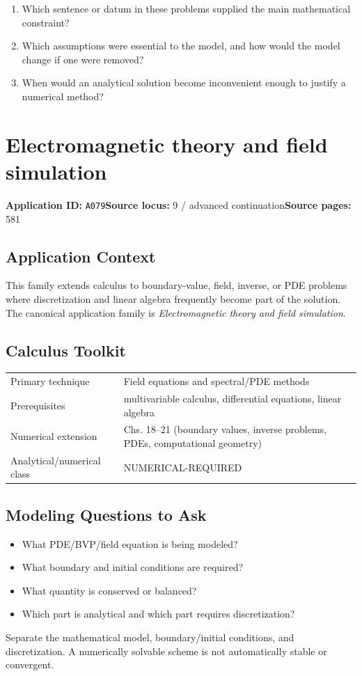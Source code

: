\documentclass[11pt]{book}
\newcommand{\pid}[1]{\texttt{#1}}
\begin{document}
\begin{reflectionbox}\begin{enumerate}
\item Which sentence or datum in these problems supplied the main mathematical constraint?
\item Which assumptions were essential to the model, and how would the model change if one were removed?
\item When would an analytical solution become inconvenient enough to justify a numerical method?
\end{enumerate}\end{reflectionbox}
\chapter{Electromagnetic theory and field simulation}\label{app:A079}
\textbf{Application ID:} \pid{A079}\quad \textbf{Source locus:} 9 / advanced continuation\quad \textbf{Source pages:} 581
\section*{Application Context}
This family extends calculus to boundary-value, field, inverse, or PDE problems where discretization and linear algebra frequently become part of the solution. The canonical application family is \emph{Electromagnetic theory and field simulation}.
\section*{Calculus Toolkit}
\begin{tabularx}{\textwidth}{@{}lX@{}}\toprule
Primary technique & Field equations and spectral/PDE methods \\
Prerequisites & multivariable calculus, differential equations, linear algebra \\
Numerical extension & Chs. 18–21 (boundary values, inverse problems, PDEs, computational geometry) \\
Analytical/numerical class & NUMERICAL-REQUIRED \\
\bottomrule\end{tabularx}
\section*{Modeling Questions to Ask}\begin{itemize}
\item What PDE/BVP/field equation is being modeled?
\item What boundary and initial conditions are required?
\item What quantity is conserved or balanced?
\item Which part is analytical and which part requires discretization?
\end{itemize}
\begin{errorbox}Separate the mathematical model, boundary/initial conditions, and discretization. A numerically solvable scheme is not automatically stable or convergent.\end{errorbox}
\end{document}
